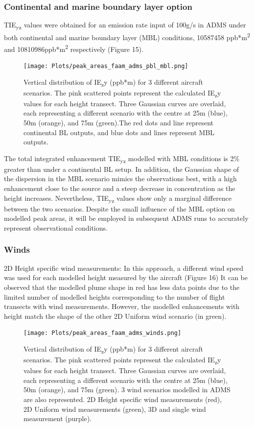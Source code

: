 \documentclass[12pt]{article}
\begin{document}
\subsubsection{Continental and marine boundary layer option}
TIE\textsubscript{yz} values were obtained for an emission rate input of 100g/s in ADMS under both continental and marine boundary layer (MBL) conditions, 10587458 ppb*m\textsuperscript{2} and 10810986ppb*m\textsuperscript{2} respectively (Figure 15).
\begin{figure}[H]
\centering
\texttt{[image: Plots/peak\_areas\_faam\_adms\_pbl\_mbl.png]}
\caption{\label{fig:volume source}}Vertical distribution of IE\textsubscript{z}y
(ppb*m) for 3 different aircraft scenarios. The pink scattered points represent the calculated IE\textsubscript{z}y values for each height transect. Three Gaussian curves are overlaid, each representing a different scenario with the centre at 25m (blue), 50m (orange), and 75m (green).The red dots and line represent continental BL outputs, and blue dots and lines represent MBL outputs. 
\end{figure}

The total integrated enhancement TIE\textsubscript{yz} modelled with MBL conditions is 2\% greater than under a continental BL setup. In addition, the Gaussian shape of the dispersion in the MBL scenario mimics the observations best, with a high enhancement close to the source and a steep decrease in concentration as the height increases. Nevertheless, TIE\textsubscript{yz} values show only a marginal difference between the two scenarios. Despite the small influence of the MBL option on modelled peak areas, it will be employed in subsequent ADMS runs to accurately  represent  observational conditions.

\subsubsection{Winds}
2D Height specific wind measurements:  In this approach, a different wind speed was used for each modelled height measured by the aircraft (Figure 16) It can be observed that the modelled plume shape in red has less data points due to the limited number  of modelled heights corresponding to the number of flight transects with wind measurements. However, the modelled enhancements with height match the shape of the other 2D Uniform wind scenario (in green).

\begin{figure}[H]
\centering
\texttt{[image: Plots/peak\_areas\_faam\_adms\_winds.png]}
\caption{\label{fig:volume source}}Vertical distribution of IE\textsubscript{z}y
(ppb*m) for 3 different aircraft scenarios. The pink scattered points represent the calculated IE\textsubscript{z}y values for each height transect. Three Gaussian curves are overlaid, each representing a different scenario with the centre at 25m (blue), 50m (orange), and 75m (green). 3 wind scenarios modelled in ADMS are also represented. 2D  Height specific wind measurements (red), 2D Uniform wind measurements (green), 3D and single wind measurement (purple). 
\end{figure}
\end{document}
